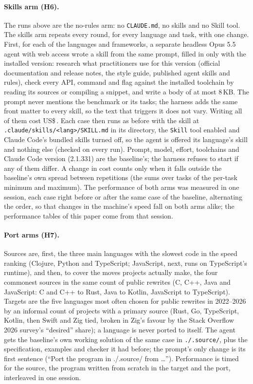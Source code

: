 \documentclass[11pt,a4paper]{article}
\begin{document}
\paragraph{Skills arm (H6).} The runs above are the no-rules arm: no \texttt{CLAUDE.md}, no skills and
no Skill tool. The skills arm repeats every round, for every language and task, with one change. First,
for each of the \NSkillLangs{} languages and frameworks, a separate headless Opus 5.5 agent with web access
wrote a skill from the same prompt, filled in only with the installed version: research what
practitioners use for this version (official documentation and release notes, the style guide, published
agent skills and rules), check every API, command and flag against the installed toolchain by reading its
sources or compiling a snippet, and write a body of at most 8\,KB. The prompt never mentions the benchmark
or its tasks; the harness adds the same front matter to every skill, so the text that triggers it does not
vary. Writing all of them cost US\$\,\SkillAuthorCost. Each case then runs as before with the skill at
\texttt{.claude/skills/<lang>/SKILL.md} in its directory, the \texttt{Skill} tool enabled and Claude
Code's bundled skills turned off, so the agent is offered its language's skill and nothing else (checked
on every run). Prompt, model, effort, toolchains and Claude Code version (2.1.331) are the baseline's; the
harness refuses to start if any of them differ. A change in cost counts only when it falls outside the
baseline's own spread between repetitions (the sums over tasks of the per-task minimum and maximum).
The performance of both arms was measured in one session, each case right before or after the same case of
the baseline, alternating the order, so that changes in the machine's speed fall on both arms alike; the
performance tables of this paper come from that session.

\paragraph{Port arms (H7).} Sources are, first, the three main languages with the slowest code in the speed
ranking (Clojure, Python and TypeScript; JavaScript, next, runs on TypeScript's runtime), and then, to cover
the moves projects actually make, the four commonest sources in the same count of public rewrites (C, C++,
Java and JavaScript: C and C++ to Rust, Java to Kotlin, JavaScript to TypeScript). Targets are the five
languages most often chosen for public rewrites in 2022--2026 by an informal count of projects with a
primary source (Rust, Go, TypeScript, Kotlin, then Swift and Zig tied, broken in Zig's favour by the Stack
Overflow 2026 survey's ``desired'' share); a language is never ported to itself. The agent gets the
baseline's own working solution of the same case in \texttt{./.source/}, plus the specification, examples and
checker it had before; the prompt's only change is its first sentence (``Port the program in ./.source/ from
\ldots''). Performance is timed for the source, the program written from scratch in the target and the port,
interleaved in one session.
\end{document}
